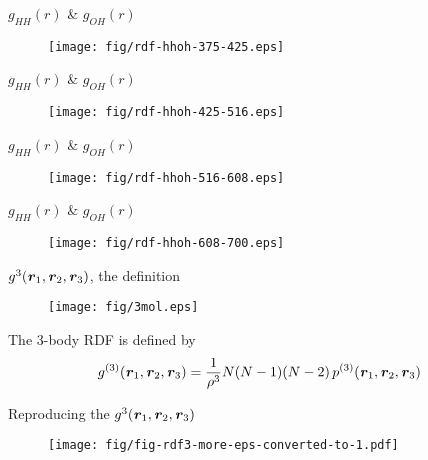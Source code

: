 \documentclass{beamer}
\newcommand{\vect}[1]{\textbf{\textit{#1}}}
\begin{document}
\begin{frame}{$g_{HH}(r)$ \& $g_{OH}(r)$}
  \begin{figure}
    \centering 
    \texttt{[image: fig/rdf-hhoh-375-425.eps]}
  \end{figure}    
\end{frame}

\begin{frame}{$g_{HH}(r)$ \& $g_{OH}(r)$}
  \begin{figure}
    \centering 
    \texttt{[image: fig/rdf-hhoh-425-516.eps]}
  \end{figure}    
\end{frame}

\begin{frame}{$g_{HH}(r)$ \& $g_{OH}(r)$}
  \begin{figure}
    \centering 
    \texttt{[image: fig/rdf-hhoh-516-608.eps]}
  \end{figure}    
\end{frame}

\begin{frame}{$g_{HH}(r)$ \& $g_{OH}(r)$}
  \begin{figure}
    \centering 
    \texttt{[image: fig/rdf-hhoh-608-700.eps]}
  \end{figure}    
\end{frame}


\begin{frame}{$g^3(\vect r_1, \vect r_2, \vect r_3)$, the definition}
  \begin{figure}
    \centering
    \texttt{[image: fig/3mol.eps]}
  \end{figure}
  The 3-body RDF is defined by
  \begin{align*}
    g^{(3)}(\vect r_1, \vect r_2, \vect r_3) =
    \frac{1}{\rho^3}N(N-1)(N-2) \,p^{(3)}(\vect r_1, \vect r_2, \vect r_3) 
  \end{align*}
\end{frame}

\begin{frame}{Reproducing the $g^3(\vect r_1, \vect r_2, \vect r_3)$}
  \begin{figure}
    \centering 
    \texttt{[image: fig/fig-rdf3-more-eps-converted-to-1.pdf]}
  \end{figure}    
\end{frame}
\end{document}
